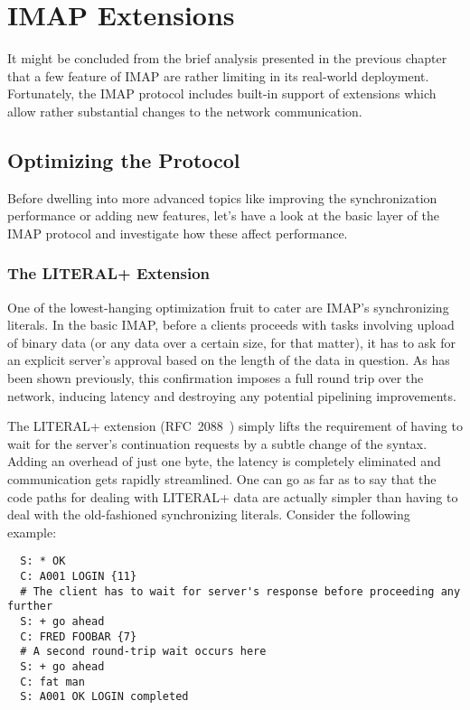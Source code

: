 \documentclass[trojita]{subfiles}
\begin{document}
\chapter{IMAP Extensions}
\label{sec:imap-extensions}

It might be concluded from the brief analysis presented in the previous chapter that a few feature of IMAP are rather
limiting in its real-world deployment.  Fortunately, the IMAP protocol includes built-in support of extensions which
allow rather substantial changes to the network communication.

\section{Optimizing the Protocol}

Before dwelling into more advanced topics like improving the synchronization performance or adding new features, let's
have a look at the basic layer of the IMAP protocol and investigate how these affect performance.

\subsection{The LITERAL+ Extension}
\label{sec:imap-literalplus}

One of the lowest-hanging optimization fruit to cater are IMAP's synchronizing literals.  In the basic IMAP, before a
clients proceeds with tasks involving upload of binary data (or any data over a certain size, for that matter), it has
to ask for an explicit server's approval based on the length of the data in question.  As has been shown previously,
this confirmation imposes a full round trip over the network, inducing latency and destroying any potential pipelining
improvements.

The LITERAL+ extension (RFC~2088~\cite{rfc2088}) simply lifts the requirement of having to wait for the server's
continuation requests by a subtle change of the syntax.  Adding an overhead of just one byte, the latency is completely
eliminated and communication gets rapidly streamlined.  One can go as far as to say that the code paths for dealing with
LITERAL+ data are actually simpler than having to deal with the old-fashioned synchronizing literals.  Consider the
following example:

\begin{verbatim}
  S: * OK
  C: A001 LOGIN {11}
  # The client has to wait for server's response before proceeding any further
  S: + go ahead
  C: FRED FOOBAR {7}
  # A second round-trip wait occurs here
  S: + go ahead
  C: fat man
  S: A001 OK LOGIN completed
\end{verbatim}
\end{document}
